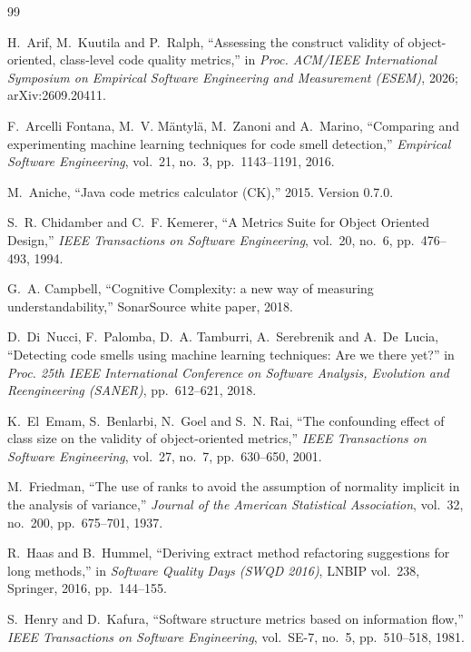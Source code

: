 \documentclass[11pt,a4paper]{article}
\begin{document}
\begin{thebibliography}{99}

 H.~Arif, M.~Kuutila and P.~Ralph,
  ``Assessing the construct validity of object-oriented, class-level code
  quality metrics,''
  in \emph{Proc. ACM/IEEE International Symposium on Empirical Software
  Engineering and Measurement (ESEM)}, 2026; arXiv:2609.20411.

 F.~Arcelli Fontana, M.~V. M\"antyl\"a, M.~Zanoni and
  A.~Marino,
  ``Comparing and experimenting machine learning techniques for code smell
  detection,''
  \emph{Empirical Software Engineering}, vol.~21, no.~3, pp.~1143--1191, 2016.

 M.~Aniche,
  ``Java code metrics calculator (CK),'' 2015. Version 0.7.0.

 S.~R. Chidamber and C.~F. Kemerer,
  ``A Metrics Suite for Object Oriented Design,''
  \emph{IEEE Transactions on Software Engineering}, vol.~20, no.~6,
  pp.~476--493, 1994.

 G.~A. Campbell,
  ``Cognitive Complexity: a new way of measuring understandability,''
  SonarSource white paper, 2018.

 D.~Di~Nucci, F.~Palomba, D.~A. Tamburri, A.~Serebrenik
  and A.~De~Lucia,
  ``Detecting code smells using machine learning techniques: Are we there
  yet?''
  in \emph{Proc. 25th IEEE International Conference on Software Analysis,
  Evolution and Reengineering (SANER)}, pp.~612--621, 2018.

 K.~El~Emam, S.~Benlarbi, N.~Goel and S.~N. Rai,
  ``The confounding effect of class size on the validity of object-oriented
  metrics,''
  \emph{IEEE Transactions on Software Engineering}, vol.~27, no.~7,
  pp.~630--650, 2001.

 M.~Friedman,
  ``The use of ranks to avoid the assumption of normality implicit in the
  analysis of variance,''
  \emph{Journal of the American Statistical Association}, vol.~32, no.~200,
  pp.~675--701, 1937.

 R.~Haas and B.~Hummel,
  ``Deriving extract method refactoring suggestions for long methods,'' in
  \emph{Software Quality Days (SWQD 2016)}, LNBIP vol.~238, Springer, 2016,
  pp.~144--155.

 S.~Henry and D.~Kafura,
  ``Software structure metrics based on information flow,''
  \emph{IEEE Transactions on Software Engineering}, vol.~SE-7, no.~5,
  pp.~510--518, 1981.


\end{thebibliography}
\end{document}
